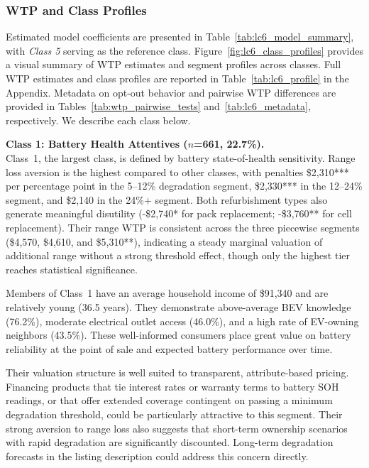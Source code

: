 \documentclass[a4paper,fleqn]{cas-sc}   %
\begin{document}


\subsubsection{WTP and Class Profiles}

Estimated model coefficients are presented in Table~\ref{tab:lc6_model_summary}, with \textit{Class 5} serving as the reference class. Figure~\ref{fig:lc6_class_profiles} provides a visual summary of WTP estimates and segment profiles across classes. Full WTP estimates and class profiles are reported in Table~\ref{tab:lc6_profile} in the Appendix. Metadata on opt-out behavior and pairwise WTP differences are provided in Tables~\ref{tab:wtp_pairwise_tests} and~\ref{tab:lc6_metadata}, respectively.  We describe each class below.

\medskip

\noindent\textbf{Class 1: Battery Health Attentives ($n$=661, 22.7\%).}\\
Class~1, the largest class, is defined by battery state-of-health sensitivity. Range loss aversion is the highest compared to other classes, with penalties \$2,310*** per percentage point in the 5--12\% degradation segment, \$2,330*** in the 12--24\% segment, and \$2,140 in the 24\%+ segment. Both refurbishment types also generate meaningful disutility (-\$2,740* for pack replacement; -\$3,760** for cell replacement). Their range WTP is consistent across the three piecewise segments (\$4,570, \$4,610, and \$5,310**), indicating a steady marginal valuation of additional range without a strong threshold effect, though only the highest tier reaches statistical significance.

Members of Class~1 have an average household income of \$91,340 and are relatively young (36.5 years). They demonstrate above-average BEV knowledge (76.2\%), moderate electrical outlet access (46.0\%), and a high rate of EV-owning neighbors (43.5\%). These well-informed consumers place great value on battery reliability at the point of sale and expected battery performance over time.

Their valuation structure is well suited to transparent, attribute-based pricing. Financing products that tie interest rates or warranty terms to battery SOH readings, or that offer extended coverage contingent on passing a minimum degradation threshold, could be particularly attractive to this segment. Their strong aversion to range loss also suggests that short-term ownership scenarios with rapid degradation are significantly discounted. Long-term degradation forecasts in the listing description could address this concern directly.
\end{document}
